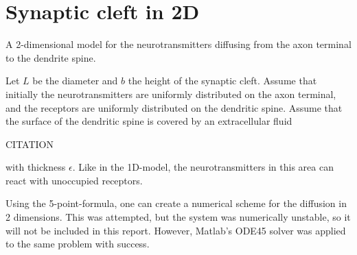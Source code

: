 \documentclass{article}
\begin{document}
\section*{Synaptic cleft in 2D}

A 2-dimensional model for the neurotransmitters diffusing from the axon terminal to the dendrite spine.

Let $L$ be the diameter and $b$ the height of the synaptic cleft. Assume that initially the neurotransmitters are uniformly distributed on the axon terminal, and the receptors are uniformly distributed on the dendritic spine. Assume that the surface of the dendritic spine is covered by an extracellular fluid 

CITATION

with thickness $\epsilon$. Like in the 1D-model, the neurotransmitters in this area can react with unoccupied receptors. 

Using the 5-point-formula, one can create a numerical scheme for the diffusion in 2 dimensions. This was attempted, but the system was numerically unstable, so it will not be included in this report. However, Matlab's ODE45 solver was applied to the same problem with success. 
\end{document}
